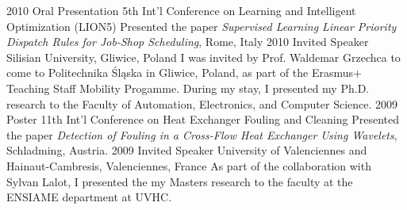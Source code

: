 \begin{entrylist}
\entry
{2010}
{Oral Presentation}
{5th Int'l Conference on Learning and Intelligent Optimization (LION5)}
{Presented the paper \emph{Supervised Learning Linear Priority Dispatch Rules for Job-Shop Scheduling}, Rome, Italy}
\entry
{2010}
{Invited Speaker}
{Silisian University, Gliwice, Poland}
{I was invited by Prof. Waldemar Grzechca to come to Politechnika Śląska in Gliwice, Poland, as part of the Erasmus+ Teaching Staff Mobility Progamme. During my stay, I presented my Ph.D. research to the Faculty of Automation, Electronics, and Computer Science.}
\entry
{2009}
{Poster}
{11th Int'l Conference on Heat Exchanger Fouling and Cleaning }
{Presented the paper \emph{Detection of Fouling in a Cross-Flow Heat Exchanger Using Wavelets}, Schladming, Austria.}
\entry
{2009}
{Invited Speaker}
{University of Valenciennes and Hainaut-Cambresis, Valenciennes, France}
{As part of the collaboration with Sylvan Lalot, I presented the my Masters research to the faculty at the ENSIAME department at UVHC.}
\end{entrylist}
